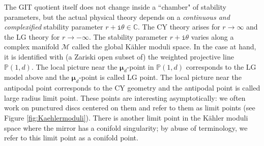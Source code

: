 \documentclass[11pt]{amsart}
\theoremstyle{definition} %
\theoremstyle{remark} %
\newcommand{\CC}{\mathbb C}
\newcommand{\PP}{\mathbb P}
\newcommand{\bmu}{\boldsymbol{\mu}}
\newcommand{\cM}{\mathcal{M}}
\newcommand{\iu}{\mathtt{i}}
\begin{document}
The GIT quotient itself does not change inside 
a ``chamber" of stability parameters,   
but the actual physical theory depends on 
a \emph{continuous and complexified} 
stability parameter $r + \iu \theta \in \CC$.  
The CY theory arises for $r\to \infty$ 
and the LG theory for $r \to -\infty$. 
The stability parameter $r+\iu \theta$ varies 
along a complex manifold $\cM$ called the global K\"{a}hler moduli space. 
In the case at hand, it is identified with (a Zariski open subset of) 
the weighted projective line $\PP(1,d)$.
The local picture near the $\bmu_d$-point in $\PP(1,d)$ 
corresponds to the LG model above 
and the $\bmu_d$-point is called LG point. 
The local picture near the antipodal point 
corresponds to the CY geometry 
and the antipodal point is called 
large radius limit point.  
These points are interesting asymptotically: 
we often work on punctured discs centered on them 
and refer to them as limit points (see Figure \ref{fig:Kaehlermoduli}). 
There is another limit point in the K\"{a}hler moduli space 
where the mirror has a conifold singularity; by abuse of 
terminology, we refer to this limit point as 
a conifold point. 
\end{document}
